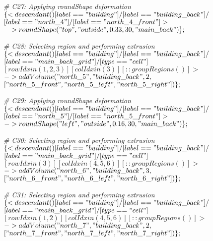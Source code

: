\noindent \textit{\# C27: Applying roundShape deformation}\\
$\{< descendant() [label=="building"] / [label=="building\_back"] / $\\
$[label=="north\_4"] / [label=="north\_4\_front"] > $\\
$-> roundShape("top", "outside", 0.33, 30, "main\_back")\};$

\noindent \textit{\# C28: Selecting region and performing extrusion}\\
$\{< descendant() [label=="building"] / [label=="building\_back"] / $\\
$[label=="main\_back\_grid"] / [type=="cell"] $\\
$[rowIdx in (1, 2, 3)] [colIdx in (3)] [::groupRegions()] > $\\
$-> addVolume("north\_5", "building\_back", 2, $\\
$["north\_5\_front", "north\_5\_left", "north\_5\_right"])\};$

\noindent \textit{\# C29: Applying roundShape deformation}\\
$\{< descendant() [label=="building"] / [label=="building\_back"] / $\\
$[label=="north\_5"] / [label=="north\_5\_front"] > $\\
$-> roundShape("left", "outside", 0.16, 30, "main\_back")\};$

\noindent \textit{\# C30: Selecting region and performing extrusion}\\
$\{< descendant() [label=="building"] / [label=="building\_back"] / $\\
$[label=="main\_back\_grid"] / [type=="cell"] $\\
$[rowIdx in (3)] [colIdx in (4, 5, 6)] [::groupRegions()] > $\\
$-> addVolume("north\_6", "building\_back", 3, $\\
$["north\_6\_front", "north\_6\_left", "north\_6\_right"])\};$

\noindent \textit{\# C31: Selecting region and performing extrusion}\\
$\{< descendant() [label=="building"] / [label=="building\_back"] / $\\
$[label=="main\_back\_grid"] / [type=="cell"] $\\
$[rowIdx in (1, 2)] [colIdx in (4, 5, 6)] [::groupRegions()] > $\\
$-> addVolume("north\_7", "building\_back", 2, $\\
$["north\_7\_front", "north\_7\_left", "north\_7\_right"])\};$

